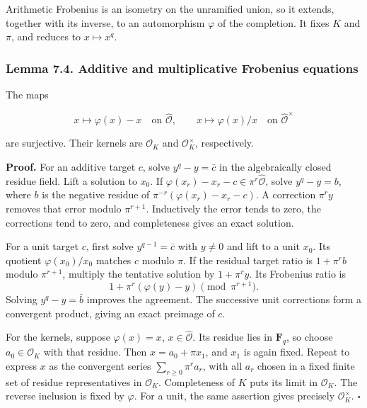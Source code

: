 \documentclass[11pt,a4paper]{article}
\begin{document}
Arithmetic Frobenius is an isometry on the unramified union, so it
extends, together with its inverse, to an automorphism \(\varphi\) of
the completion. It fixes \(K\) and \(\pi\), and reduces to
\(x\mapsto x^q\).

\subsubsection{Lemma 7.4. Additive and multiplicative Frobenius
equations}\label{lemma-7.4.-additive-and-multiplicative-frobenius-equations}

The maps

\[
x\longmapsto\varphi(x)-x
\quad\text{on }\widehat{\mathcal O},\qquad
x\longmapsto\varphi(x)/x
\quad\text{on }\widehat{\mathcal O}^{\times}
\tag{8}
\]

are surjective. Their kernels are \(\mathcal O_K\) and
\(\mathcal O_K^\times\), respectively.

\textbf{Proof.} For an additive target \(c\), solve \(y^q-y=\bar c\) in
the algebraically closed residue field. Lift a solution to \(x_0\). If
\(\varphi(x_r)-x_r-c\in\pi^r\widehat{\mathcal O}\), solve \(y^q-y=b\),
where \(b\) is the negative residue of \(\pi^{-r}(\varphi(x_r)-x_r-c)\).
A correction \(\pi^r y\) removes that error modulo \(\pi^{r+1}\).
Inductively the error tends to zero, the corrections tend to zero, and
completeness gives an exact solution.

For a unit target \(c\), first solve \(y^{q-1}=\bar c\) with \(y\ne0\)
and lift to a unit \(x_0\). Its quotient \(\varphi(x_0)/x_0\) matches
\(c\) modulo \(\pi\). If the residual target ratio is \(1+\pi^r b\)
modulo \(\pi^{r+1}\), multiply the tentative solution by \(1+\pi^r y\).
Its Frobenius ratio is \[
1+\pi^r(\varphi(y)-y)\pmod{\pi^{r+1}}.
\] Solving \(y^q-y=\bar b\) improves the agreement. The successive unit
corrections form a convergent product, giving an exact preimage of
\(c\).

For the kernels, suppose \(\varphi(x)=x\), \(x\in\widehat{\mathcal O}\).
Its residue lies in \(\mathbf F_q\), so choose \(a_0\in\mathcal O_K\)
with that residue. Then \(x=a_0+\pi x_1\), and \(x_1\) is again fixed.
Repeat to express \(x\) as the convergent series
\(\sum_{r\geq0}\pi^r a_r\), with all \(a_r\) chosen in a fixed finite
set of residue representatives in \(\mathcal O_K\). Completeness of
\(K\) puts its limit in \(\mathcal O_K\). The reverse inclusion is fixed
by \(\varphi\). For a unit, the same assertion gives precisely
\(\mathcal O_K^\times\). \(\square\)
\end{document}
